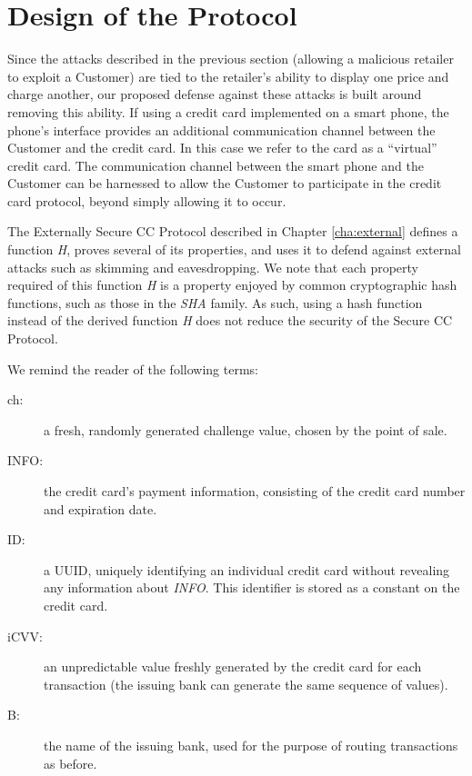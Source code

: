 \section{Design of the Protocol}
\label{sec:secure-design}

Since the attacks described in the previous section (allowing a malicious retailer to exploit a Customer)
	are tied to the retailer's ability to display one price and charge another,
	our proposed defense against these attacks is built around removing this ability.
If using a credit card implemented on a smart phone, the phone's interface provides an additional communication channel between the Customer and the credit card.
In this case we refer to the card as a ``virtual'' credit card.
The communication channel between the smart phone and the Customer can be harnessed to allow the Customer to participate in the credit card protocol,
	beyond simply allowing it to occur.

The Externally Secure CC Protocol described in Chapter \ref{cha:external} defines a function \emph{H},
    proves several of its properties, and uses it to defend against external attacks such as skimming and eavesdropping.
We note that each property required of this function \emph{H} is a property enjoyed by common cryptographic hash functions,
    such as those in the \emph{SHA} family.
As such, using a hash function instead of the derived function \emph{H} does not reduce the security of the Secure CC Protocol.

We remind the reader of the following terms:

\begin{description}
\item[ch:] a fresh, randomly generated challenge value, chosen by the point of sale.
\item[INFO:] the credit card's payment information, consisting of the credit card number and expiration date.
\item[ID:] a UUID, uniquely identifying an individual credit card without revealing any information about \emph{INFO}.
	This identifier is stored as a constant on the credit card.
\item[iCVV:] an unpredictable value freshly generated by the credit card for each transaction (the issuing bank can generate the same sequence of values).
\item[B:] the name of the issuing bank, used for the purpose of routing transactions as before.
\end{description}

